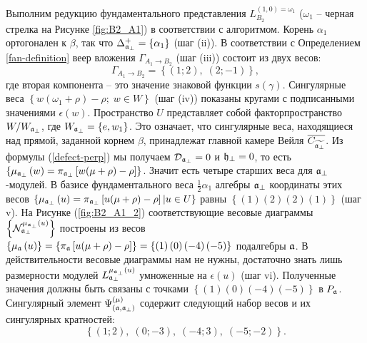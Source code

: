 Выполним редукцию фундаментального представления  $L^{(1,0)=\omega_1}_{B_2}$ ($\omega_1$ -- черная стрелка на Рисунке \ref{fig:B2_A1}) в соответствии с алгоритмом.
Корень $\alpha_1$ ортогонален к $\beta$, так что  $\Delta_{\mathfrak{a}_{\perp}}^+ = \left\{ \alpha_1 \right\}$ (шаг (ii)).
В соответствии с Определением \ref{fan-definition} веер вложения $\Gamma_{A_1\to B_2}$ (шаг (iii)) состоит из двух весов:
\begin{equation*}
  \label{eq:22}
  \Gamma_{A_1\to B_2}=\left\{ (1;2),\; (2;-1) \right\},
\end{equation*}
где вторая компонента -- это значение знаковой функции  $s(\gamma)$.
Сингулярные веса  $\left\{ w (\omega_1 +\rho)-\rho ;\;w \in W\right\}$ (шаг (iv)) показаны кругами с подписанными значениями $\epsilon\left( w \right)$. Пространство  $U$ представляет собой факторпространство $W/W_{\mathfrak{a}_{\perp}}$, где $W_{\mathfrak{a}_{\perp}}=\left\{e,w_1\right\}$. Это означает, что сингулярные веса, находящиеся над прямой, заданной корнем $\beta$, принадлежат главной камере Вейля $\overline{C_{\widetilde{\mathfrak{a}_{\perp }}}}$. Из формулы (\ref{defect-perp})  мы получаем  $\mathcal{D}_{\mathfrak{a}_{\perp }}=0$ и $\mathfrak{h}_{\perp }=0$, то есть $\left\{ \mu _{\mathfrak{a}_{\perp}}\left( w\right)=\pi _{\mathfrak{a}_{\perp}}\left[ w(\mu +\rho)-\rho \right]\right\}$. Значит есть четыре старших веса для $\mathfrak{a}_{\perp }$-модулей.  В базисе фундаментального веса $\frac{1}{2} \alpha_1$ алгебры $\mathfrak{a}_{\perp}$ координаты этих весов
$\left\{ \mu _{\mathfrak{a}_{\perp}}\left( u\right)=\pi _{\mathfrak{a}_{\perp}}\left[ u(\mu +\rho)-\rho \right]| u \in U \right\}$
равны
$\left\{ \left( 1\right) \left( 2\right) \left( 2\right) \left( 1\right) \right\}$ (шаг v).
На Рисунке (\ref{fig:B2_A1_2}) соответствующие весовые диаграммы
$\left\{ \mathcal{N}_{\mathfrak{a}_{\perp }}^{\mu _{\mathfrak{a}_{\perp }}\left( u\right) }\right\} $
построены из весов $\left\{ \mu _{\mathfrak{a}}\left( u\right)\right\} =\left\{\pi _{\mathfrak{a}}\left[ u(\mu +\rho )-\rho \right]\right\}
=\left\{ \left( 1\right) \left( 0\right) \left( -4\right) \left( -5\right) \right\}$ подалгебры   $\mathfrak{a}$.
В действительности весовые диаграммы нам не нужны, достаточно знать лишь размерности модулей
$L_{\mathfrak{a}_{\perp }}^{\mu_{\mathfrak{a}_{\perp }}\left( u\right) }$ умноженные на
$\epsilon \left( u\right) $ (шаг vi). Полученные значения должны быть связаны с точками
$\left\{ \left( 1\right) \left( 0\right) \left( -4\right) \left( -5\right) \right\}$ в $P_{\mathfrak{a}}$. Сингулярный элемент $\Psi ^{\left( \mu \right) }_{\left(  \mathfrak{a}, \mathfrak{a}_{\perp} \right)}$ содержит следующий набор весов и их сингулярных кратностей:
\begin{equation}
  \label{eq:25}
  \left\{(1;2),\; (0;-3),\; (-4;3),\; (-5;-2)\right\}.
\end{equation}


